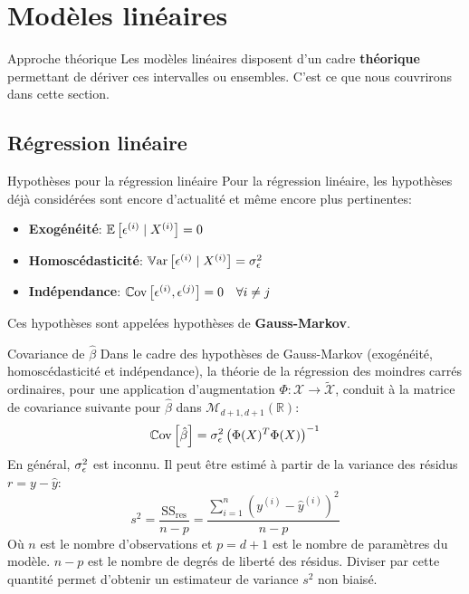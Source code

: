 \section[Modèles linéaires]{Modèles linéaires}

\begin{frame}{Approche théorique}
	Les modèles linéaires disposent d'un cadre \textbf{théorique} permettant de dériver ces intervalles ou ensembles. C'est ce que nous couvrirons dans cette section.
\end{frame}

\subsection[Régression linéaire]{Régression linéaire}

\begin{frame}{Hypothèses pour la régression linéaire}
	Pour la régression linéaire, les hypothèses déjà considérées sont encore d'actualité et même encore plus pertinentes:
	\begin{itemize}
		\item \textbf{Exogénéité}: $\operatorname{\mathbb{E}}\left[\epsilon^{(i)} \mid X^{(i)}\right] = 0$
		\item \textbf{Homoscédasticité}: $\operatorname{\mathbb{V}ar}\left[\epsilon^{(i)} \mid X^{(i)}\right] = \sigma_{\epsilon}^2$
		\item \textbf{Indépendance}: $\operatorname{\mathbb{C}ov}\left[\epsilon^{(i)}, \epsilon^{(j)}\right] = 0 \quad \forall i \ne j$
	\end{itemize}
	Ces hypothèses sont appelées hypothèses de \textbf{Gauss-Markov}.
\end{frame}

\begin{frame}{Covariance de $\hat{\beta}$}
	Dans le cadre des hypothèses de Gauss-Markov (exogénéité, homoscédasticité et indépendance), la théorie de la régression des moindres carrés ordinaires, pour une application d'augmentation $\Phi: \mathcal{X} \to \tilde{\mathcal{X}}$, conduit à la matrice de covariance suivante pour $\hat{\beta}$ dans $\mathcal{M}_{d+1, d+1}\left(\mathbb{R}\right)$:
	\begin{equation}
		\operatorname{\mathbb{C}ov}\left[\hat{\beta}\right] = \sigma_{\epsilon}^2 \left(\Phi(X)^T \Phi(X)\right)^{-1}
		\nonumber
	\end{equation}
	\pause
	En général, $\sigma_{\epsilon}^2$ est inconnu. Il peut être estimé à partir de la variance des résidus $r = y - \hat{y}$:
	\begin{equation}
		s^2 = \frac{\text{SS}_{\text{res}}}{n - p} = \frac{\sum_{i=1}^n \left(y^{(i)} - \hat{y}^{(i)}\right)^2}{n - p}
		\nonumber
	\end{equation}
	Où $n$ est le nombre d'observations et $p = d + 1$ est le nombre de paramètres du modèle. $n - p$ est le nombre de degrés de liberté des résidus. Diviser par cette quantité permet d'obtenir un estimateur de variance $s^2$ non biaisé.
\end{frame}

